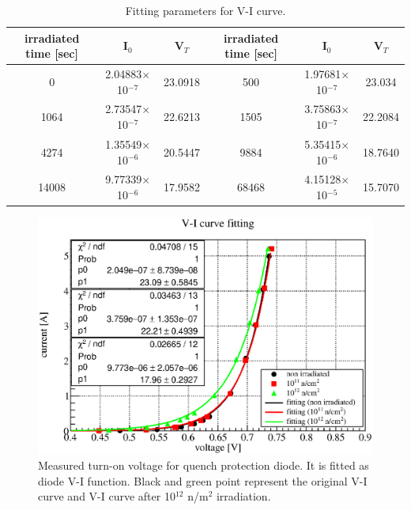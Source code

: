 \begin{table}[H]
 \centering
 \begin{tabular}{cccccc} \hline \hline
  irradiated time [sec] & I$_0$ & V$_T$ & irradiated time [sec] & I$_0$ & V$_T$ \\ \hline
  0 & 2.04883$\times$10$^{-7}$ & 23.0918 & 500 & 1.97681$\times$10$^{-7}$ & 23.034 \\
  1064 & 2.73547$\times$10$^{-7}$ & 22.6213 & 1505 & 3.75863$\times$10$^{-7}$ & 22.2084 \\
  4274 & 1.35549$\times$10$^{-6}$ & 20.5447 & 9884 & 5.35415$\times$10$^{-6}$ & 18.7640 \\
  14008 & 9.77339$\times$10$^{-6}$ & 17.9582 & 68468 & 4.15128$\times$10$^{-5}$ & 15.7070 \\ \hline \hline
 \end{tabular}
 \caption{Fitting parameters for V-I curve.}
 \label{fit3}
\end{table}
  \begin{figure}[H]
    \centering
    \includegraphics[scale=0.45]{chapter4/fig/diodefit.eps}
   \caption{Measured turn-on voltage for quench protection diode. It is fitted as diode V-I function. Black and green point represent the original V-I curve and V-I curve after 10$^{12}$ n/m$^2$ irradiation.}
   \label{3fitdiode}
  \end{figure}
 
